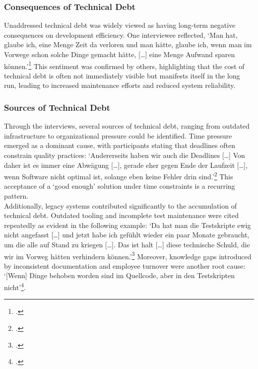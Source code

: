 \subsubsection{Consequences of Technical Debt}
Unaddressed technical debt was widely viewed as having long-term negative consequences on development efficiency. One interviewee reflected, `Man hat, glaube ich, eine Menge Zeit da verloren und man hätte, glaube ich, wenn man im Vorwege schon solche Dinge gemacht hätte, [\ldots] eine Menge Aufwand sparen können.'\footcite{Interview12025}
This sentiment was confirmed by others, highlighting that the cost of technical debt is often not immediately visible but manifests itself in the long run, leading to increased maintenance efforts and reduced system reliability.\\

\subsubsection{Sources of Technical Debt}
Through the interviews, several sources of technical debt, ranging from outdated infrastructure to organizational pressure could be identified. Time pressure emerged as a dominant cause, with participants stating that deadlines often constrain quality practices: `Andererseits haben wir auch die Deadlines [\ldots] Von daher ist es immer eine Abwägung
[\ldots], gerade eher gegen Ende der Laufzeit [\ldots], wenn Software nicht optimal ist, solange eben keine Fehler drin sind.'\footcite{Interview22025} This acceptance of a `good enough' solution under time constraints is a recurring pattern.\\

Additionally, legacy systems contributed significantly to the accumulation of technical debt. Outdated tooling and incomplete test maintenance were cited repeatedly as evident in the following example: `Da hat man die Testskripte ewig nicht angefasst [\ldots] und jetzt habe ich gefühlt wieder ein paar Monate gebraucht, um die alle auf Stand zu kriegen [\ldots].
Das ist halt [\ldots] diese technische Schuld, die wir im Vorweg hätten verhindern können.'\footcite{Interview12025} Moreover, knowledge gaps introduced by inconsistent documentation and employee turnover were another root cause: `[Wenn] Dinge behoben worden sind im Quellcode, aber in den Testskripten nicht'\footcite{Interview12025}.


